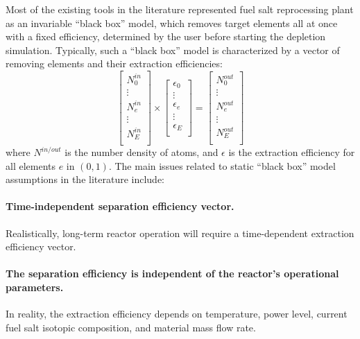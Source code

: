 Most of the existing tools in the literature represented fuel salt 
reprocessing plant as an invariable ``black box'' model, which removes target 
elements all at once with a fixed efficiency, determined by the user before 
starting the depletion simulation. Typically, such a ``black box'' model is 
characterized by a vector of removing elements and their extraction 
efficiencies:
\begin{equation}
\begin{bmatrix}
N^{in}_{0} \\ \vdots \\ N^{in}_{e} \\ \vdots \\ N^{in}_{E} \\
\end{bmatrix} 
\times
\begin{bmatrix}
\epsilon_{0} \\ \vdots \\ \epsilon_{e} \\ \vdots \\ \epsilon_{E} \\
\end{bmatrix} =
\begin{bmatrix}
N^{out}_{0}\\ \vdots \\ N^{out}_{e} \\ \vdots \\N^{out}_{E}  \\
\end{bmatrix}
\end{equation}
where $N^{in/out}$ is the number density of atoms, and $\epsilon$ is the 
extraction efficiency for all elements $e$ in $(0, 1)$. The main issues 
related to static ``black box'' model assumptions in the literature include: 
\paragraph{Time-independent separation efficiency vector.} Realistically, 
long-term reactor operation will require a time-dependent extraction 
efficiency vector.
\paragraph{The separation efficiency is independent of the reactor's 
operational parameters.} In reality, the extraction efficiency depends on 
temperature, power level, current fuel salt isotopic composition, and material 
mass flow rate.
